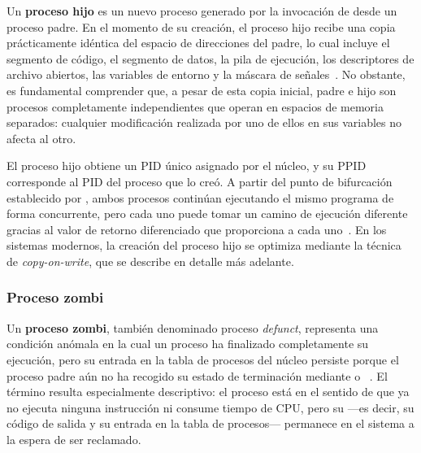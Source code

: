 Un \textbf{proceso hijo} es un nuevo proceso generado por la invocación de  desde un proceso padre. En el momento de su creación, el proceso hijo recibe una copia prácticamente idéntica del espacio de direcciones del padre, lo cual incluye el segmento de código, el segmento de datos, la pila de ejecución, los descriptores de archivo abiertos, las variables de entorno y la máscara de señales~\cite{stevens2013}. No obstante, es fundamental comprender que, a pesar de esta copia inicial, padre e hijo son procesos completamente independientes que operan en espacios de memoria separados: cualquier modificación realizada por uno de ellos en sus variables no afecta al otro.

El proceso hijo obtiene un PID único asignado por el núcleo, y su PPID corresponde al PID del proceso que lo creó. A partir del punto de bifurcación establecido por , ambos procesos continúan ejecutando el mismo programa de forma concurrente, pero cada uno puede tomar un camino de ejecución diferente gracias al valor de retorno diferenciado que  proporciona a cada uno~\cite{kerrisk2010}. En los sistemas modernos, la creación del proceso hijo se optimiza mediante la técnica de \textit{copy-on-write}, que se describe en detalle más adelante.

\subsubsection{Proceso zombi}
\label{subsubsec:proceso_zombi}

Un \textbf{proceso zombi}, también denominado proceso \textit{defunct}, representa una condición anómala en la cual un proceso ha finalizado completamente su ejecución, pero su entrada en la tabla de procesos del núcleo persiste porque el proceso padre aún no ha recogido su estado de terminación mediante  o ~\cite{love2013}. El término  resulta especialmente descriptivo: el proceso está  en el sentido de que ya no ejecuta ninguna instrucción ni consume tiempo de CPU, pero su  ---es decir, su código de salida y su entrada en la tabla de procesos--- permanece en el sistema a la espera de ser reclamado.

